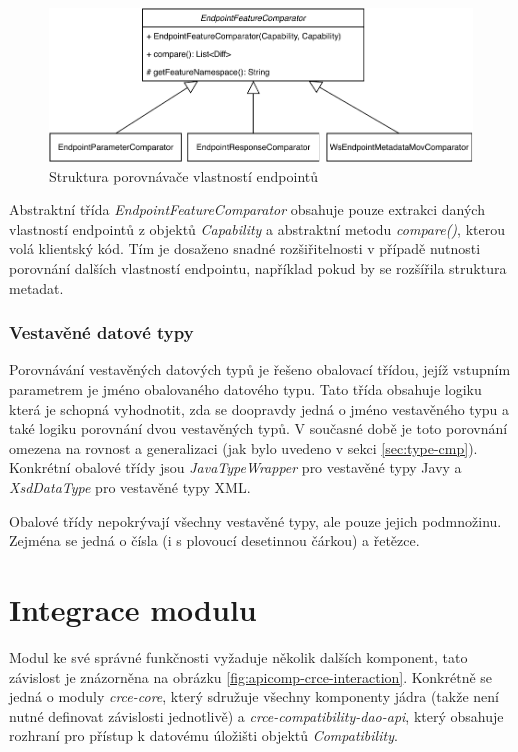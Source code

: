\documentclass[czech,DP]{thesiskiv}
\begin{document}
\begin{figure}[h]
	\centering
	\includegraphics[width=\linewidth]{endpoint-cmp-uml-class}
	\caption{Struktura porovnávače vlastností endpointů}
	\label{fig:endpoint-cmp-uml-class}
\end{figure}

Abstraktní třída \textit{EndpointFeatureComparator} obsahuje pouze extrakci daných vlastností endpointů z objektů \textit{Capability} a abstraktní metodu \textit{compare()}, kterou volá klientský kód. Tím je dosaženo snadné rozšiřitelnosti v případě nutnosti porovnání dalších vlastností endpointu, například pokud by se rozšířila struktura metadat. 

\subsubsection{Vestavěné datové typy}

Porovnávání vestavěných datových typů je řešeno obalovací třídou, jejíž vstupním parametrem je jméno obalovaného datového typu. Tato třída obsahuje logiku která je schopná vyhodnotit, zda se doopravdy jedná o jméno vestavěného typu a také logiku porovnání dvou vestavěných typů. V současné době je toto porovnání omezena na rovnost a generalizaci (jak bylo uvedeno v sekci \ref{sec:type-cmp}). Konkrétní obalové třídy jsou \textit{JavaTypeWrapper} pro vestavěné typy Javy a \textit{XsdDataType} pro vestavěné typy XML. 

Obalové třídy nepokrývají všechny vestavěné typy, ale pouze jejich podmnožinu. Zejména se jedná o čísla (i s plovoucí desetinnou čárkou) a řetězce.

\section{Integrace modulu}

Modul ke své správné funkčnosti vyžaduje několik dalších komponent, tato závislost je znázorněna na obrázku \ref{fig:apicomp-crce-interaction}. Konkrétně se jedná o moduly \textit{crce-core}, který sdružuje všechny komponenty jádra (takže není nutné definovat závislosti jednotlivě) a \textit{crce-compatibility-dao-api}, který obsahuje rozhraní pro přístup k datovému úložišti objektů \textit{Compatibility}. 
\end{document}
